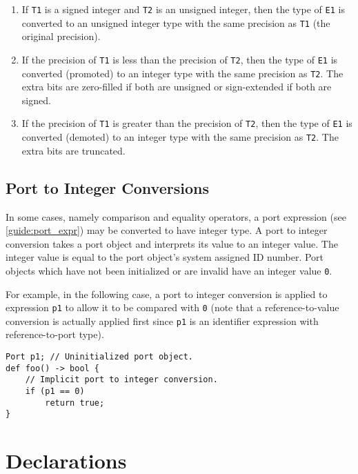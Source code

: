 \begin{enumerate}
\item If \texttt{T1} is a signed integer and \texttt{T2} is an unsigned integer, then the type of \texttt{E1} is converted to an unsigned integer type with the same precision as \texttt{T1} (the original precision).

\item If the precision of \texttt{T1} is less than the precision of \texttt{T2}, then the type of \texttt{E1} is converted (promoted) to an integer type with the same precision as \texttt{T2}. The extra bits are zero-filled if both are unsigned or sign-extended if both are signed.

\item If the precision of \texttt{T1} is greater than the precision of \texttt{T2}, then the type of \texttt{E1} is converted (demoted) to an integer type with the same precision as \texttt{T2}. The extra bits are truncated.
\end{enumerate}

\subsection{Port to Integer Conversions} \label{guide:port_conv}

In some cases, namely comparison and equality operators, a port expression (see \ref{guide:port_expr}) may be converted to have integer type. A port to integer conversion takes a port object and interprets its value to an integer value. The integer value is equal to the port object's system assigned ID number. Port objects which have not been initialized or are invalid have an integer value \texttt{0}.

For example, in the following case, a port to integer conversion is applied to expression \texttt{p1} to allow it to be compared with \texttt{0} (note that a reference-to-value conversion is actually applied first since \texttt{p1} is an identifier expression with reference-to-port type).

\begin{minip}
\begin{lstlisting}
Port p1; // Uninitialized port object.
def foo() -> bool {
	// Implicit port to integer conversion.
	if (p1 == 0)
		return true;
}
\end{lstlisting}
\end{minip}


\section{Declarations} \label{guide:declarations}

